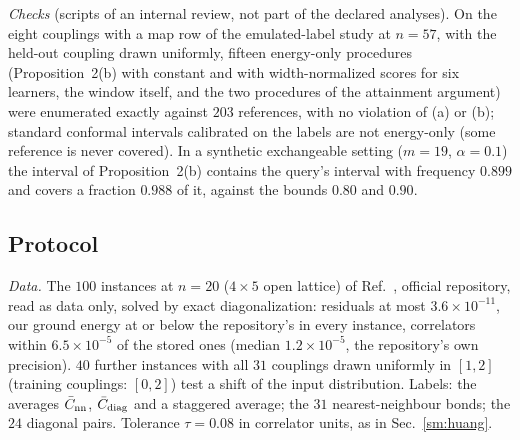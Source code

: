\documentclass[aps,prx,onecolumn,10pt,nofootinbib,longbibliography,floatfix]{revtex4-2}
\theoremstyle{remark}
\begin{document}
\emph{Checks} (scripts of an internal review, not part of the declared analyses). On the eight couplings with a map row
of the emulated-label study at $n=57$, with the held-out coupling drawn uniformly, fifteen energy-only procedures %
(Proposition~2(b) with constant and with width-normalized scores for six learners, the window itself, and the two %
procedures of the attainment argument) were enumerated exactly against $203$ references, with no violation of (a) %
or (b); standard conformal intervals calibrated on the labels are not energy-only (some reference is never
covered). In a synthetic exchangeable setting ($m=19$, $\alpha=0.1$) the interval of Proposition~2(b) contains the %
query's interval with frequency $0.899$ and covers a fraction $0.988$ of it, against the bounds $0.80$ and $0.90$. %

\subsection{Protocol}

\emph{Data.} The $100$ instances at $n=20$ ($4\times5$ open lattice) of Ref.~\cite{huang2022}, official repository, %
read as data only, solved by exact diagonalization: residuals at most $3.6\times10^{-11}$, our ground energy at or %
below the repository's in every instance, correlators within $6.5\times10^{-5}$ of the stored ones (median %
$1.2\times10^{-5}$, the repository's own precision). $40$ further instances with all $31$ couplings drawn uniformly %
in $[1,2]$ (training couplings: $[0,2]$) test a shift of the input distribution. Labels: the averages
$\bar C_{\rm nn}$, $\bar C_{\rm diag}$ and a staggered average; the $31$ nearest-neighbour bonds; the $24$ diagonal %
pairs. Tolerance $\tau=0.08$ in correlator units, as in Sec.~\ref{sm:huang}. %
\end{document}
